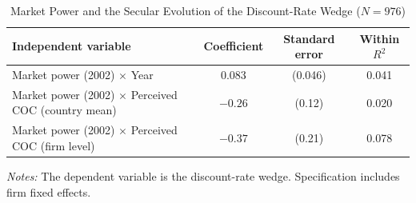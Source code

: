 \begin{table}[htbp]
    \centering
    \caption{Market Power and the Secular Evolution of the Discount-Rate Wedge
    (\(N = 976\))}
    \label{tab:market_power_discount_wedge}
    \begin{tabular}{lccc}
        \toprule
        Independent variable
            & Coefficient
            & Standard error
            & Within \(R^2\) \\
        \midrule
        Market power (2002) $\times$ Year
            & 0.083
            & (0.046)
            & 0.041 \\

        Market power (2002) $\times$ Perceived COC (country mean)
            & $-0.26$
            & (0.12)
            & 0.020 \\

        Market power (2002) $\times$ Perceived COC (firm level)
            & $-0.37$
            & (0.21)
            & 0.078 \\
        \bottomrule
    \end{tabular}

    \begin{minipage}{0.92\linewidth}
        \footnotesize
        \vspace{0.5em}
        \textit{Notes:} The dependent variable is the discount-rate wedge. Specification includes firm fixed effects.
    \end{minipage}
\end{table}